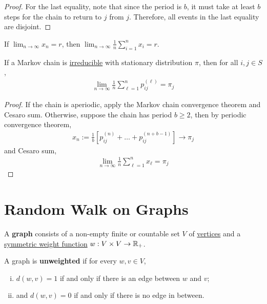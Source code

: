 \documentclass{article}
\begin{document}
	\begin{proof}
		For the last equality, note that since the period is $b$, it must take at least $b$ steps for the chain to return to $j$ from $j$. Therefore, all events in the last equality are disjoint.
	\end{proof}

	\begin{lemma}
		If $\lim_{n \to \infty} x_n = r$, then $\lim_{n \to \infty} \frac{1}{n} \sum_{i=1}^n x_i = r$.
	\end{lemma}

	\begin{theorem}
		If a Markov chain is \ul{irreducible} with stationary distribution $\pi$, then for all $i, j \in S$,
		\begin{align}
			\lim_{n \to \infty} \frac{1}{n} \sum_{\ell=1}^n p_{ij}^{(\ell)} = \pi_j
		\end{align}
	\end{theorem}
	
	\begin{proof}
		If the chain is aperiodic, apply the Markov chain convergence theorem and Cesaro sum. Otherwise, suppose the chain has period $b \geq 2$, 
		then by periodic convergence theorem,
		\begin{align}
			x_n := \frac{1}{b}\left[p_{i j}^{(n)}+\ldots+p_{i j}^{(n+b-1)}\right] \to \pi_j
		\end{align}
		and Cesaro sum,
		\begin{align}
			\lim_{n\to\infty} \frac{1}{n} \sum_{\ell=1}^n x_\ell = \pi_j
		\end{align}
	\end{proof}
	
	\section{Random Walk on Graphs}
	\begin{definition}
		A \textbf{graph} consists of a non-empty finite or countable set $V$ of \ul{vertices} and a \ul{symmetric weight function} $w: V \times V \to \mathbb{R}_+$.
	\end{definition}
	
	\begin{definition}
		A graph is \textbf{unweighted} if for every $w, v \in V$,
		\begin{enumerate}[(i)]
			\item $d(w, v) = 1$ if and only if there is an edge between $w$ and $v$;
			\item and $d(w, v) = 0$ if and only if there is no edge in between.
		\end{enumerate}
	\end{definition}
	
\end{document}
